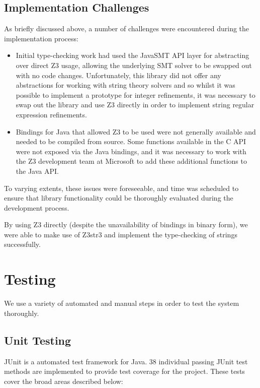 \documentclass[a4paper,openany,12pt]{book}
\begin{document}
\section{Implementation Challenges}

As briefly discussed above, a number of challenges were encountered during the implementation process:

\begin{itemize}
    \item Initial type-checking work had used the JavaSMT API layer for abstracting over direct Z3 usage,
          allowing the underlying SMT solver to be swapped out with no code changes. Unfortunately,
    this library did not offer any abstractions for working with string theory solvers and so whilst it was
    possible to implement a prototype for integer refinements, it was necessary to swap out the library and use
    Z3 directly in order to implement string regular expression refinements.
    \item Bindings for Java that allowed Z3 to be used were not generally available and needed to be compiled from source.
    Some functions available in the C API were not exposed via the Java bindings, and it was necessary to work with
    the Z3 development team at Microsoft to add these additional functions to the Java API.
\end{itemize}

To varying extents, these issues were foreseeable, and time was scheduled to ensure that library functionality could
be thoroughly evaluated during the development process.

By using Z3 directly (despite the unavailability of bindings in binary form), we were able to make use of Z3str3 and
implement the type-checking of strings successfully.


\chapter{Testing}

We use a variety of automated and manual steps in order to test the system thoroughly.

\section{Unit Testing}

JUnit is a automated test framework for Java.
38 individual passing JUnit test methods are implemented to provide test coverage for the project.
These tests cover the broad areas described below:
\end{document}
